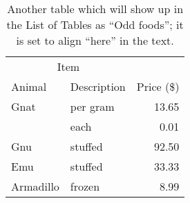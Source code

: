 \begin{table}[h]
    \centering
    \begin{tabular}{llr}
        \toprule
        \multicolumn{2}{c}{Item} \\
    \cline{1-2}
    Animal & Description & Price (\$) \\
    \midrule
    Gnat  & per gram & 13.65 \\
     & each     &  0.01 \\
    Gnu   & stuffed  & 92.50 \\
    Emu   & stuffed  & 33.33 \\
    Armadillo & frozen & 8.99 \\
    \bottomrule
    \end{tabular}
    \caption[Odd foods]{Another table which will show up in the List of
        Tables as ``Odd foods''; it is set to align ``here'' in the text.}
\end{table}
